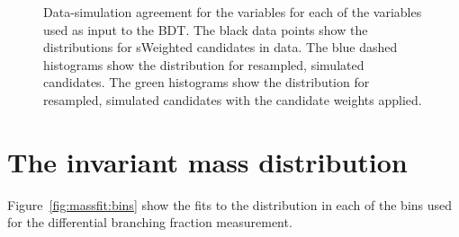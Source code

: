 \begin{figure}[!htb]
 \caption{Data-simulation agreement for the variables for each of the variables used as input to the BDT. The black data points show the distributions for sWeighted \BdToJPsiKst candidates in data. The blue dashed histograms show the distribution for resampled, simulated \BdToJPsiKst candidates. The green histograms show the distribution for resampled, simulated \BdToJPsiKst candidates with the candidate weights applied.}
 \label{fig:appendix:data-mc:bdtvars}
\end{figure}

\section{The \kpimm invariant mass distribution}
\label{sec:appendix:massfits}

Figure~\ref{fig:massfit:bins} show the fits to the \mkpimm distribution in each of the \qsq bins used for the differential branching fraction measurement.
 
